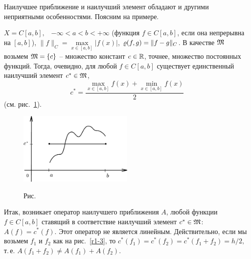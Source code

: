 


Наилучшее приближение и наилучший элемент обладают и другими
неприятными особенностями. Поясним на
примере.

\begin{Example}
$X=C[a,b],$~ $-\infty < a < b < +\infty$ {(функция $f\in
C[a,b]$,} {если она непрерывна на $[a,b]$)},
{$\|f\|_C=\max\limits_{x\in[a,b]}|f(x)|$,}
$\varrho(f,g)=\|f-g\|_C$. В качестве $\mathfrak{M}$ возьмем $\mathfrak{M}=\{c \}$
{--} множество констант $c \in \mathbb{R}${, точнее, множество}
{постоянных функций}. Тогда, очевидно, {для любой} $ f
\in C[a,b]$ существует единственный наилучший элемент $c^* \in
\mathfrak{M}$, {
$$
c^* = \frac{\max\limits_{x\in[a,b]}{f(x)}+\min\limits_{x\in[a,b]} {f(x)}}{2}
$$
}
(см. рис.~\ref{r1-2}).
\end{Example}


\begin{figure}[ht]
\begin{center}
\includegraphics[width=0.5\textwidth]{pict01-2.eps}
\end{center}
 \bigskip
 \label{r1-2}

 \centerline{Рис.~\theris}
 \bigskip
\end{figure}






Итак, возникает оператор {наилучшего приближения} $A${,}
любой функции $f \in C[a,b]$ ставящий в соответствие
наилучший элемент $c^* \in \mathfrak{M}$: $A(f)=c^*(f).$ Этот оператор не является линейным.
Действительно, если мы возьмем $f_1$ и $f_2$ как на рис.~\ref{r1-3}, то
$c^*(f_1)=c^*(f_2)=c^*(f_1+f_2)=h/2,$ т.\,е. $A(f_1+f_2)\ne A(f_1)+A(f_2).$

